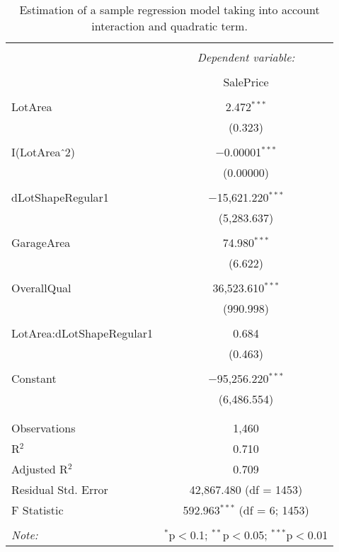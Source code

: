 \documentclass{article}
\begin{document}
\begin{table}[t]
\centering
\caption{\label{tab:sampleregressionall} Estimation of a sample regression model taking into account interaction and quadratic term.}
\begin{tabular}{@{\extracolsep{5pt}}lc} 
\\[-1.8ex]\hline 
\hline \\[-1.8ex] 
 & \multicolumn{1}{c}{\textit{Dependent variable:}} \\ 
\cline{2-2} 
\\[-1.8ex] & SalePrice \\ 
\hline \\[-1.8ex] 
 LotArea & 2.472$^{***}$ \\ 
  & (0.323) \\ 
  & \\ 
 I(LotArea$\hat{\mkern6mu}$2) & $-$0.00001$^{***}$ \\ 
  & (0.00000) \\ 
  & \\ 
 dLotShapeRegular1 & $-$15,621.220$^{***}$ \\ 
  & (5,283.637) \\ 
  & \\ 
 GarageArea & 74.980$^{***}$ \\ 
  & (6.622) \\ 
  & \\ 
 OverallQual & 36,523.610$^{***}$ \\ 
  & (990.998) \\ 
  & \\ 
 LotArea:dLotShapeRegular1 & 0.684 \\ 
  & (0.463) \\ 
  & \\ 
 Constant & $-$95,256.220$^{***}$ \\ 
  & (6,486.554) \\ 
  & \\ 
\hline \\[-1.8ex] 
Observations & 1,460 \\ 
R$^{2}$ & 0.710 \\ 
Adjusted R$^{2}$ & 0.709 \\ 
Residual Std. Error & 42,867.480 (df = 1453) \\ 
F Statistic & 592.963$^{***}$ (df = 6; 1453) \\ 
\hline 
\hline \\[-1.8ex] 
\textit{Note:}  & \multicolumn{1}{r}{$^{*}$p$<$0.1; $^{**}$p$<$0.05; $^{***}$p$<$0.01} \\ 
\end{tabular} 
\end{table}
\end{document}
